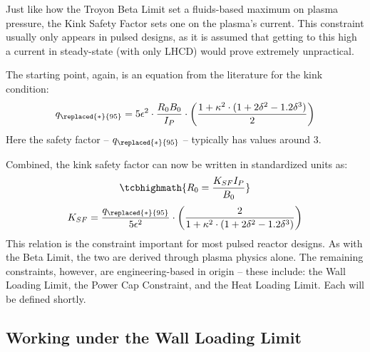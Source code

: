 Just like how the Troyon Beta Limit set a fluids-based maximum on plasma pressure, the Kink Safety Factor sets one on the plasma's current. This constraint usually only appears in pulsed designs, as it is assumed that getting to this high a current in steady-state (with only LHCD) would prove extremely unpractical.

The starting point, again, is an equation from the literature for the kink condition: \cite{process,oldpaper}
\begin{equation}
	q_{\replaced{*}{95}} = 5 \epsilon^2 \cdot  \frac{ R_0 B_0 }{ I_P } \cdot \left( \frac{1 + \kappa^2 \cdot ( 1 + 2 \delta^2 - 1.2 \delta^3 ) }{2} \right)
\end{equation}
Here the safety factor -- $q_{\replaced{*}{95}}$ --  typically has values around 3. 

Combined, the kink safety factor can now be written in standardized units as:
\begin{equation}
	\label{eq:r_kink}
   \tcbhighmath{ R_0 = \frac{ K_{SF} I_P }{ B_0 } }
\end{equation} 
\begin{equation}
  K_{SF} = \frac{q_{\replaced{*}{95}}}{5 \epsilon^2} \cdot \left( \frac{2}{1 + \kappa^2 \cdot ( 1 + 2 \delta^2 - 1.2 \delta^3 ) } \right)
\end{equation}
This relation is the  constraint important for most pulsed reactor designs. As with the Beta Limit, the two are derived through plasma physics alone. The remaining  constraints, however, are engineering-based in origin -- these include: the Wall Loading Limit, the Power Cap Constraint, and the Heat Loading Limit. Each will be defined shortly.

\subsection{Working under the Wall Loading Limit}

\label{subsection:wall_loading}

